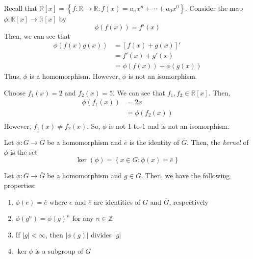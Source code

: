 \begin{nexample}
    Recall that \(\mathbb{R}[x] = \left\{f : \mathbb{R} \to \mathbb{R} : f(x) = a_n x^n + \cdots + a_0 x^0\right\}\). Consider the map \(\phi : \mathbb{R}[x] \to \mathbb{R}[x]\) by
    \[
        \phi(f(x)) = f'(x)
    \]
    Then, we can see that
    \[
    \begin{aligned}
        \phi(f(x) g(x)) &= [f(x) + g(x)]' \\
                        &= f'(x) + g'(x) \\
                        &= \phi(f(x)) + \phi(g(x))
    \end{aligned}
    \]
    Thus, \(\phi\) is a homomorphism. However, \(\phi\) is not an isomorphism.

    Choose \(f_1(x) = 2\) and \(f_2(x) = 5\). We can see that \(f_1, f_2 \in \mathbb{R}[x]\). Then,
    \[
    \begin{aligned}
        \phi(f_1(x)) &= 2x \\
                     &= \phi(f_2(x)) \\
    \end{aligned}
    \]
    However, \(f_1(x) \neq f_2(x)\). So, \(\phi\) is not 1-to-1 and is not an isomorphism.
\end{nexample}

\begin{definition}[Kernel]
    Let \(\phi : G \to \overline{G}\) be a homomorphism and \(\overline{e}\) is the identity of \(\overline{G}\). Then, the \textit{kernel} of \(\phi\) is the set
    \[
        \ker(\phi) = \left\{x \in G : \phi(x) = \overline{e}\right\}
    \]
\end{definition}

\begin{theorem}
    Let \(\phi : G \to \overline{G}\) be a homomorphism and \(g \in G\). Then, we have the following properties:
    \begin{enumerate}
        \item \(\phi(e) = \overline{e}\) where \(e\) and \(\overline{e}\) are identities of \(G\) and \(\overline{G}\), respectively
        \item \(\phi(g^n) = \phi(g)^n\) for any \(n \in \mathbb{Z}\)
        \item If \(|g| < \infty\), then \(|\phi(g)|\) divides \(|g|\)
        \item \(\ker\phi\) is a subgroup of \(G\)
    \end{enumerate}
\end{theorem}

